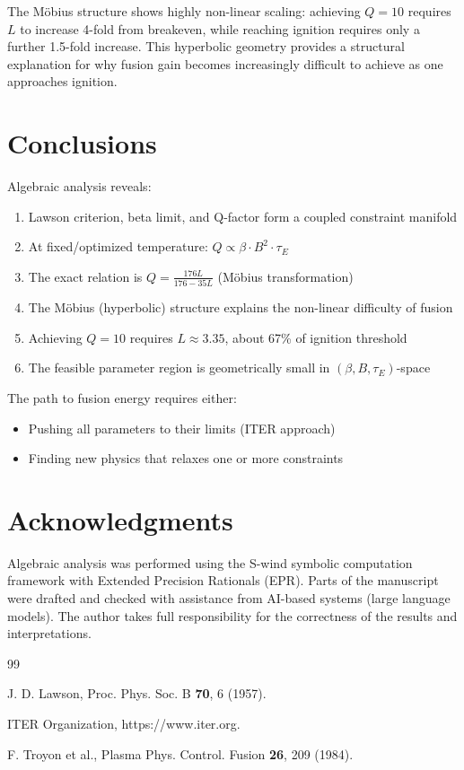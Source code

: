 \documentclass[11pt,a4paper]{article}
\begin{document}
The M\"{o}bius structure shows highly non-linear scaling: achieving $Q=10$
requires $L$ to increase 4-fold from breakeven, while reaching ignition
requires only a further 1.5-fold increase. This hyperbolic geometry 
provides a structural explanation for why fusion gain becomes 
increasingly difficult to achieve as one approaches ignition.

\section{Conclusions}

Algebraic analysis reveals:

\begin{enumerate}
\item Lawson criterion, beta limit, and Q-factor form a coupled constraint manifold
\item At fixed/optimized temperature: $Q \propto \beta \cdot B^2 \cdot \tau_E$
\item The exact relation is $Q = \frac{176L}{176 - 35L}$ (M\"{o}bius transformation)
\item The M\"{o}bius (hyperbolic) structure explains the non-linear difficulty of fusion
\item Achieving $Q = 10$ requires $L \approx 3.35$, about 67\% of ignition threshold
\item The feasible parameter region is geometrically small in $(\beta, B, \tau_E)$-space
\end{enumerate}

The path to fusion energy requires either:
\begin{itemize}
\item Pushing all parameters to their limits (ITER approach)
\item Finding new physics that relaxes one or more constraints
\end{itemize}

\section*{Acknowledgments}
Algebraic analysis was performed using the S-wind symbolic computation 
framework with Extended Precision Rationals (EPR). Parts of the manuscript 
were drafted and checked with assistance from AI-based systems (large 
language models). The author takes full responsibility for the correctness 
of the results and interpretations.

\begin{thebibliography}{99}

J. D. Lawson, Proc. Phys. Soc. B \textbf{70}, 6 (1957).

ITER Organization, https://www.iter.org.

F. Troyon et al., Plasma Phys. Control. Fusion \textbf{26}, 209 (1984).

\end{thebibliography}
\end{document}
